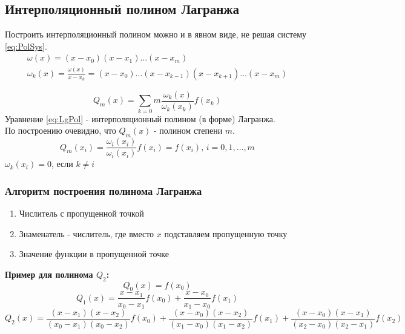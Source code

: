 \documentclass[a4paper,11pt]{article}
\begin{document}
  \subsection{Интерполяционный полином Лагранжа}
  Построить интерполяционный полином можно и в явном виде, не решая систему \ref{eq:PolSys}.
  \begin{gather*}
    \omega(x) = (x - x_0)(x - x_1)\dots(x - x_m) \\
    \omega_k(x) = \frac{\omega(x)}{x - x_k} = (x - x_0)\dots(x - x_{k-1})(x - x_{k+1})\dots(x - x_m)
  \end{gather*}

  \begin{equation}
    Q_m(x) = \sum_{k=0}{m} \frac{\omega_k(x)}{\omega_k(x_k)} f(x_k)
    \label{eq:LgPol}
  \end{equation}
  Уравнение \ref{eq:LgPol} - интерполяционный полином (в форме) Лагранжа. \\
  По построению очевидно, что $Q_m(x)$ - полином степени $m$.
  \[Q_m(x_i) = \frac{\omega_i(x_i)}{\omega_i(x_i)} f(x_i) = f(x_i), \, i=0,1,\dots,m\]
  \(\omega_k(x_i) = 0\), если \(k \ne i\)

    \subsubsection{Алгоритм построения полинома Лагранжа}
    \begin{enumerate}
      \item Числитель с пропущенной точкой
      \item Знаменатель - числитель, где вместо $x$ подставляем пропущенную точку
      \item Значение функции в пропущенной точке
    \end{enumerate}
    \textbf{Пример для полинома $Q_2$:}
    \[Q_0(x) = f(x_0)\]
    \[Q_1(x) = \frac{x-x_1}{x_0-x_1}f(x_0) + \frac{x-x_0}{x_1-x_0}f(x_1)\]
    \[Q_2(x) = \frac{(x-x_1)(x-x_2)}{(x_0-x_1)(x_0-x_2)}f(x_0) + \frac{(x-x_0)(x-x_2)}{(x_1-x_0)(x_1-x_2)}f(x_1) + \frac{(x-x_0)(x-x_1)}{(x_2-x_0)(x_2-x_1)}f(x_2)\]
\end{document}

